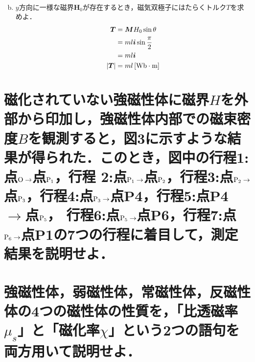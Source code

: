 \documentclass[dvipdfmx]{ujarticle}
\begin{document}
\begin{enumerate}[(a)]
	\begin{align*}
	\end{align*}
	\item $y$方向に一様な磁界$\boldsymbol{H}_{0}$が存在するとき，磁気双極子にはたらくトルク$T$を求めよ．
	\begin{align*}
		\boldsymbol{T}&=\boldsymbol{M}H_{0}\sin \theta \\
		&=ml\boldsymbol{i}\sin \frac{\pi}{2}\\
		&=ml\boldsymbol{i}\\
		|\boldsymbol{T}|&=ml\,[\rm{Wb\cdot m}]
	\end{align*}
\end{enumerate}

\section{磁化されていない強磁性体に磁界$H$を外部から印加し，強磁性体内部での磁束密度$B$を観測すると，図3に示すような結果が得られた．このとき，図中の行程1:点$\rm{O}\to$点$\rm{P_{1}}$，行程 2:点$\rm{P_{1}}\to$点$\rm{P_{2}}$，行程3:点$\rm{P_{2}}\to$点$\rm{P_{3}}$，行程4:点$\rm{P_{3}}\to$点P4，行程5:点P4 $\to$点$\rm{P_{5}}$， 行程6:点$\rm{P_{5}}\to$点P6，行程7:点$\rm{P_{6}}\to$点P1の7つの行程に着目して，測定結果を説明せよ．}

\section{強磁性体，弱磁性体，常磁性体，反磁性体の4つの磁性体の性質を，「比透磁率$\mu_{s}$」と「磁化率$\chi$」という2つの語句を両方用いて説明せよ．}
\end{document}
